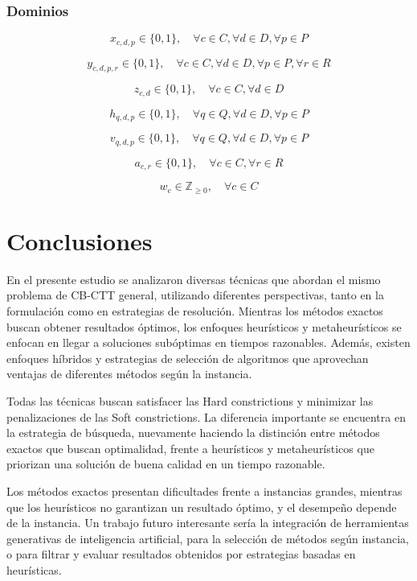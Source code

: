 \documentclass[letter, 10pt]{article}
\begin{document}
\subsubsection{Dominios}
\[
x_{c,d,p} \in \{0,1\}, \quad \forall c \in C, \forall d \in D, \forall p \in P
\]

\[
y_{c,d,p,r} \in \{0,1\}, \quad \forall c \in C, \forall d \in D, \forall p \in P, \forall r \in R
\]

\[
z_{c,d} \in \{0,1\}, \quad \forall c \in C, \forall d \in D
\]

\[
h_{q,d,p} \in \{0,1\}, \quad \forall q \in Q, \forall d \in D, \forall p \in P
\]

\[
v_{q,d,p} \in \{0,1\}, \quad \forall q \in Q, \forall d \in D, \forall p \in P
\]

\[
a_{c,r} \in \{0,1\}, \quad \forall c \in C, \forall r \in R
\]

\[
w_c \in \mathbb{Z}_{\geq 0}, \quad \forall c \in C
\]

\section{Conclusiones}
En el presente estudio se analizaron diversas t\'ecnicas que abordan el mismo problema de CB-CTT general, utilizando diferentes perspectivas, tanto en la formulaci\'on como en estrategias de resoluci\'on. Mientras los m\'etodos exactos buscan obtener resultados \'optimos, los enfoques heur\'isticos y metaheur\'isticos se enfocan en llegar a soluciones sub\'optimas en tiempos razonables. Adem\'as, existen enfoques h\'ibridos y estrategias de selecci\'on de algoritmos que aprovechan ventajas de diferentes m\'etodos seg\'un la instancia.

Todas las t\'ecnicas buscan satisfacer las Hard constrictions y minimizar las penalizaciones de las Soft constrictions. La diferencia importante se encuentra en la estrategia de b\'usqueda, nuevamente haciendo la distinci\'on entre m\'etodos exactos que buscan optimalidad, frente a heur\'isticos y metaheur\'isticos que priorizan una soluci\'on de buena calidad en un tiempo razonable.

Los m\'etodos exactos presentan dificultades frente a instancias grandes, mientras que los heur\'isticos no garantizan un resultado \'optimo, y el desempe\~no depende de la instancia. Un trabajo futuro interesante ser\'ia la integraci\'on de herramientas generativas de inteligencia artificial, para la selecci\'on de m\'etodos seg\'un instancia, o para filtrar y evaluar resultados obtenidos por estrategias basadas en heur\'isticas.
\end{document}
